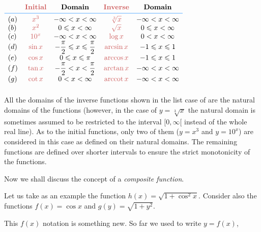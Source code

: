 {\begin{center}
\begin{tcolorbox}[colback=white,colframe=DodgerBlue]
\centering
$\begin{array}{l>{\color{IndianRed}}cc>{\color{IndianRed}}cc}
\arrayrulecolor{DodgerBlue}
 & \textbf{Initial} & \textbf{Domain} & \textbf{Inverse} & \textbf{Domain} \\
 \midrule
(a) & x^{3}& -\infty < x < \infty &\sqrt[3]{x} & -\infty < x < \infty\\
(b) & x^{2} & 0 \leqslant x < \infty & \sqrt{x} & 0 \leqslant x < \infty\\
(c) & 10^{x} & -\infty < x < \infty & \log x &  0 < x < \infty\\
(d) & \sin x & -\dfrac{\pi}{2}  \leqslant x  \leqslant \dfrac{\pi}{2} & \arcsin x & -1 \leqslant x \leqslant 1\\
(e) & \cos x & 0 \leqslant x \leqslant \pi & \arccos x & -1 \leqslant x \leqslant 1\\
(f) & \tan x & -\dfrac{\pi}{2}  < x  < \dfrac{\pi}{2}& \arctan x & -\infty < x < \infty \\
(g) & \cot x & 0 < x < \infty & \text{arccot}\, x &  -\infty < x < \infty\\[5pt]
\end{array}$
\end{tcolorbox}
\end{center}



All the domains of the inverse functions shown in the list case of are the natural domains of the functions (however, in the case of $y=\sqrt[3]{x}$ the natural domain is sometimes assumed to be restricted to the interval $[0, \infty[$ instead of the whole real line). As to the initial functions, only two of them ($y = x^{3}$ and $y = 10^{x}$) are considered in this case as defined on their natural domains. The remaining functions are defined over shorter intervals to ensure the strict monotonicity of the functions.

Now we shall discuss the concept of a \emph{composite function}.

Let us take as an example the function $h (x) =\sqrt{1 + \cos^{2} x}$. Consider also the functions $f (x) = \cos x$ and $g (y) = \sqrt{1+y^{2}}$.

\rdr This $f(x)$ notation is something new. So far we used to write $y = f (x)$,

}
